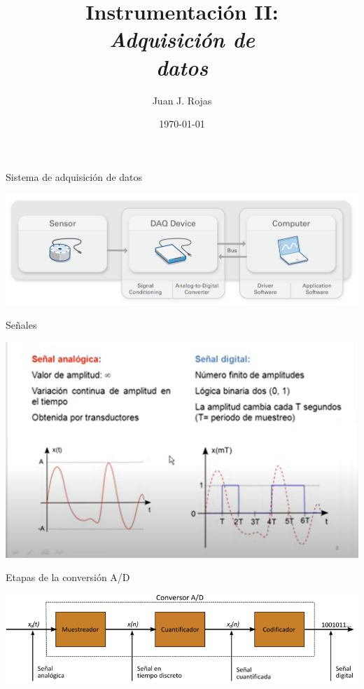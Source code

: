 \documentclass[aspectratio=169]{beamer}
\title{Instrumentación II: \\ \emph{Adquisición de}\\ \emph{datos}}
\author{Juan J. Rojas}
\institute{Instituto Tecnológico de Costa Rica}
\date{\today}
\begin{document}

\maketitle

\newcommand{\blackandwhite}{white} %

\begin{frame}{Sistema de adquisición de datos}
\begin{center}
    \includegraphics[width=0.93\linewidth]{presentaciones/fig/daq.png}
\end{center}
\end{frame}

\begin{frame}{Señales}
\begin{center}
    \includegraphics[width=0.8\linewidth]{presentaciones/fig/analogico_digital.png}
\end{center}
\end{frame}

\begin{frame}{Etapas de la conversión A/D}
\begin{center}
    \includegraphics[width=0.93\linewidth]{presentaciones/fig/detalleDAQ.png}
\end{center}
\end{frame}
\end{document}
